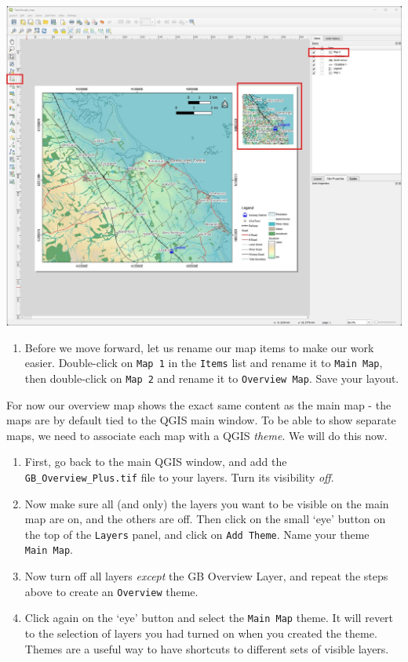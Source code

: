 \documentclass[
  letterpaper,
  DIV=11,
  numbers=noendperiod]{scrreprt}
\providecommand{\tightlist}{%
  \setlength{\itemsep}{0pt}\setlength{\parskip}{0pt}}\usepackage{longtable,booktabs,array}
\begin{document}
\includegraphics{images/lab_8/lab8_fig17_first_inset.jpg}

\begin{enumerate}
\def\labelenumi{(\arabic{enumi})}
\setcounter{enumi}{269}
\tightlist
\item
  Before we move forward, let us rename our map items to make our work
  easier. Double-click on \texttt{Map\ 1} in the \texttt{Items} list and
  rename it to \texttt{Main\ Map}, then double-click on \texttt{Map\ 2}
  and rename it to \texttt{Overview\ Map}. Save your layout.
\end{enumerate}

For now our overview map shows the exact same content as the main map -
the maps are by default tied to the QGIS main window. To be able to show
separate maps, we need to associate each map with a QGIS \emph{theme}.
We will do this now.

\begin{enumerate}
\def\labelenumi{(\arabic{enumi})}
\setcounter{enumi}{270}
\item
  First, go back to the main QGIS window, and add the
  \texttt{GB\_Overview\_Plus.tif} file to your layers. Turn its
  visibility \emph{off}.
\item
  Now make sure all (and only) the layers you want to be visible on the
  main map are on, and the others are off. Then click on the small `eye'
  button on the top of the \texttt{Layers} panel, and click on
  \texttt{Add\ Theme}. Name your theme \texttt{Main\ Map}.
\item
  Now turn off all layers \emph{except} the GB Overview Layer, and
  repeat the steps above to create an \texttt{Overview} theme.
\item
  Click again on the `eye' button and select the \texttt{Main\ Map}
  theme. It will revert to the selection of layers you had turned on
  when you created the theme. Themes are a useful way to have shortcuts
  to different sets of visible layers.
\end{enumerate}
\end{document}
